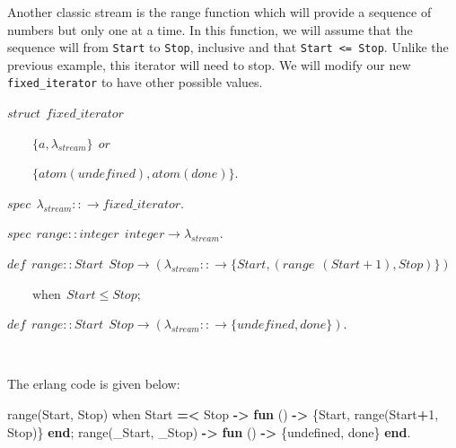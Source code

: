 \documentclass[
]{book}
\newenvironment{Shaded}{\begin{snugshade}}{\end{snugshade}}
\newcommand{\CharTok}[1]{\textcolor[rgb]{0.31,0.60,0.02}{#1}}
\newcommand{\DecValTok}[1]{\textcolor[rgb]{0.00,0.00,0.81}{#1}}
\newcommand{\FunctionTok}[1]{\textcolor[rgb]{0.00,0.00,0.00}{#1}}
\newcommand{\KeywordTok}[1]{\textcolor[rgb]{0.13,0.29,0.53}{\textbf{#1}}}
\newcommand{\OperatorTok}[1]{\textcolor[rgb]{0.81,0.36,0.00}{\textbf{#1}}}
\newcommand{\VariableTok}[1]{\textcolor[rgb]{0.00,0.00,0.00}{#1}}
\begin{document}
Another classic stream is the range function which will provide a sequence of numbers but only one at a time. In this function, we will assume that the sequence will from \texttt{Start} to \texttt{Stop}, inclusive and that \texttt{Start\ \textless{}=\ Stop}. Unlike the previous example, this iterator will need to stop. We will modify our new \texttt{fixed\_iterator} to have other possible values.

\begin{formulabox}
\(struct ~ ~ \mathit{f}ixed\_iterator\)

\(\quad \quad \lbrace a, \lambda_{stream} \rbrace ~ ~ or\)

\(\quad \quad \lbrace atom(unde\mathit{f}ined), atom(done) \rbrace.\)

\(spec ~ ~ \lambda_{stream} :: \rightarrow \mathit{f}ixed\_iterator.\)

\(spec ~ ~ range :: integer ~ ~ integer \rightarrow \lambda_{stream}.\)

\(de\mathit{f} ~ ~ range :: Start ~ ~ Stop \rightarrow (\lambda_{stream} :: \rightarrow \lbrace Start, (range ~ ~ (Start+1), Stop) \rbrace )\)

\(\quad \quad \text{when} ~ ~ Start \leq Stop;\)

\(de\mathit{f} ~ ~ range :: Start ~ ~ Stop \rightarrow (\lambda_{stream} :: \rightarrow \lbrace undefined, done \rbrace).\)

\end{formulabox}

\(\nonumber\)

The erlang code is given below:

\begin{Shaded}
\begin{Highlighting}[]
\FunctionTok{range(}\VariableTok{Start}\FunctionTok{,} \VariableTok{Stop}\FunctionTok{)} \CharTok{when} \VariableTok{Start} \OperatorTok{=\textless{}} \VariableTok{Stop} \OperatorTok{{-}\textgreater{}}
    \KeywordTok{fun} \FunctionTok{()} \OperatorTok{{-}\textgreater{}} \FunctionTok{\{}\VariableTok{Start}\FunctionTok{,} \FunctionTok{range(}\VariableTok{Start}\OperatorTok{+}\DecValTok{1}\FunctionTok{,} \VariableTok{Stop}\FunctionTok{)\}} \KeywordTok{end}\FunctionTok{;}
\FunctionTok{range(}\VariableTok{\_Start}\FunctionTok{,} \VariableTok{\_Stop}\FunctionTok{)} \OperatorTok{{-}\textgreater{}}
    \KeywordTok{fun} \FunctionTok{()} \OperatorTok{{-}\textgreater{}} \FunctionTok{\{}\CharTok{undefined}\FunctionTok{,} \CharTok{done}\FunctionTok{\}} \KeywordTok{end}\FunctionTok{.}
\end{Highlighting}
\end{Shaded}
\end{document}
